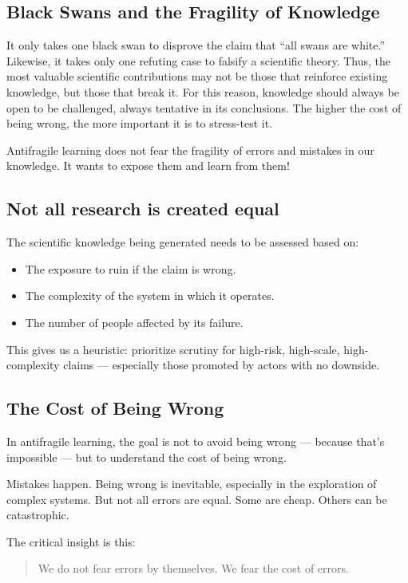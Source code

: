 \subsection{Black Swans and the Fragility of Knowledge}

It only takes one black swan to disprove the claim that “all swans are white.” Likewise, it takes only one refuting case to falsify a scientific theory. Thus, the most valuable scientific contributions may not be those that reinforce existing knowledge, but those that break it. For this reason, knowledge should always be open to be challenged, always tentative in its conclusions. The higher the cost of being wrong, the more important it is to stress-test it.

Antifragile learning does not fear the fragility of errors and mistakes in our knowledge. It wants to expose them and learn from them!

\subsection{Not all research is created equal}

The scientific knowledge being generated needs to be assessed based on:
\begin{itemize}
	\item The exposure to ruin if the claim is wrong.
	\item The complexity of the system in which it operates.
	\item The number of people affected by its failure.
\end{itemize}

This gives us a heuristic: prioritize scrutiny for high-risk, high-scale, high-complexity claims — especially those promoted by actors with no downside.

\subsection{The Cost of Being Wrong}

In antifragile learning, the goal is not to avoid being wrong — because that’s impossible — but to understand the cost of being wrong.

Mistakes happen. Being wrong is inevitable, especially in the exploration of complex systems. But not all errors are equal. Some are cheap. Others can be catastrophic. 

The critical insight is this:
\begin{quote}
	We do not fear errors by themselves. We fear the cost of errors.
\end{quote}

